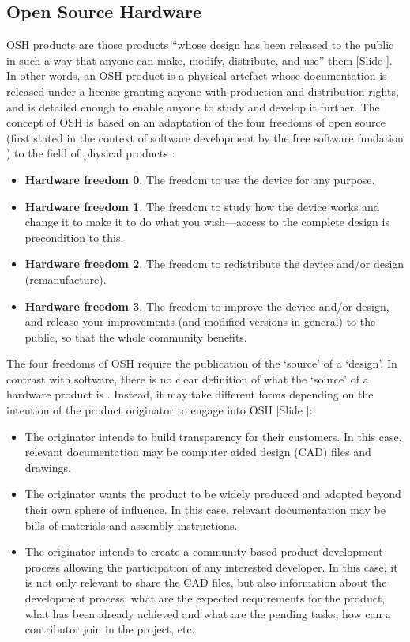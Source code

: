 \documentclass{article}
\newcounter{slide}
\begin{document}
\subsection{Open Source Hardware}
\label{sec:OSH}
OSH products are those products ``whose design has been released to the public in such a way that anyone can make, modify, distribute, and use'' them \cite{opensourcehardwareassociationOpenSourceHardware2016} {\color{blue}[Slide ]}. In other words, an OSH product is a physical artefact whose documentation is released under a license granting anyone with production and distribution rights, and is detailed enough to enable anyone to study and develop it further. The concept of OSH is based on an adaptation of the four freedoms of open source (first stated in the context of software development by the free software fundation \cite{freesoftwarefoundationFreeSoftwareDefinition2015}) to the field of physical products \cite{powellDemocratizingProductionOpen2012}: 
\begin{itemize}
	\item \textbf{Hardware freedom 0}. The freedom to use the device for any purpose.
	\item \textbf{Hardware freedom 1}. The freedom to study how the device works and change it to make it to do what you wish---access to the complete design is precondition to this.
	\item \textbf{Hardware freedom 2}. The freedom to redistribute the device and/or design (remanufacture).
	\item \textbf{Hardware freedom 3}. The freedom to improve the device and/or design, and release your improvements (and modified versions in general) to the public, so that the whole community benefits.
\end{itemize}

The four freedoms of OSH require the publication of the `source' of a `design'. In contrast with software, there is no clear definition of what the `source' of a hardware product is \cite{bonvoisinWhatSourceOpen2017}. Instead, it may take different forms depending on the intention of the product originator to engage into OSH {\color{blue}[Slide ]}:
\begin{itemize}
  \item The originator intends to build transparency for their customers. In this case, relevant documentation may be computer aided design (CAD) files and drawings.
  \item The originator wants the product to be widely produced and adopted beyond their own sphere of influence. In this case, relevant documentation may be bills of materials and assembly instructions.
  \item The originator intends to create a community-based product development process allowing the participation of any interested developer. In this case, it is not only relevant to share the CAD files, but also information about the development process: what are the expected requirements for the product, what has been already achieved and what are the pending tasks, how can a contributor join in the project, etc.
\end{itemize}
\end{document}
